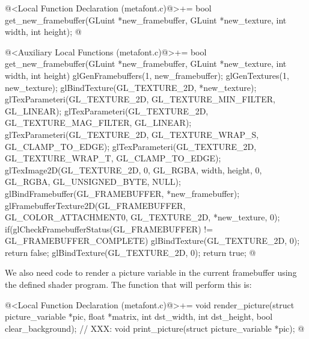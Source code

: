 {{{{{\iniciocodigo
@<Local Function Declaration (metafont.c)@>+=
bool get_new_framebuffer(GLuint *new_framebuffer, GLuint *new_texture,
                         int width, int height);
@
\fimcodigo

\iniciocodigo
@<Auxiliary Local Functions (metafont.c)@>+=
bool get_new_framebuffer(GLuint *new_framebuffer, GLuint *new_texture,
                         int width, int height){
  glGenFramebuffers(1, new_framebuffer);
  glGenTextures(1, new_texture);
  glBindTexture(GL_TEXTURE_2D, *new_texture);
  glTexParameteri(GL_TEXTURE_2D, GL_TEXTURE_MIN_FILTER, GL_LINEAR);
  glTexParameteri(GL_TEXTURE_2D, GL_TEXTURE_MAG_FILTER, GL_LINEAR);
  glTexParameteri(GL_TEXTURE_2D, GL_TEXTURE_WRAP_S, GL_CLAMP_TO_EDGE);
  glTexParameteri(GL_TEXTURE_2D, GL_TEXTURE_WRAP_T, GL_CLAMP_TO_EDGE);
  glTexImage2D(GL_TEXTURE_2D, 0, GL_RGBA, width, height, 0, GL_RGBA,
               GL_UNSIGNED_BYTE, NULL);
  glBindFramebuffer(GL_FRAMEBUFFER, *new_framebuffer);
  glFramebufferTexture2D(GL_FRAMEBUFFER, GL_COLOR_ATTACHMENT0, GL_TEXTURE_2D,
                         *new_texture, 0);
  if(glCheckFramebufferStatus(GL_FRAMEBUFFER) != GL_FRAMEBUFFER_COMPLETE){
    glBindTexture(GL_TEXTURE_2D, 0);
    return false;
  }
  glBindTexture(GL_TEXTURE_2D, 0);
  return true;
}
@
\fimcodigo

We also need code to render a picture variable in the current
framebuffer using the defined shader program. The function that will
perform this is:

\iniciocodigo
@<Local Function Declaration (metafont.c)@>+=
void render_picture(struct picture_variable *pic, float *matrix, int dst_width,
                    int dst_height, bool clear_background);
// XXX:
void print_picture(struct picture_variable *pic);
@
\fimcodigo

}}}}}
